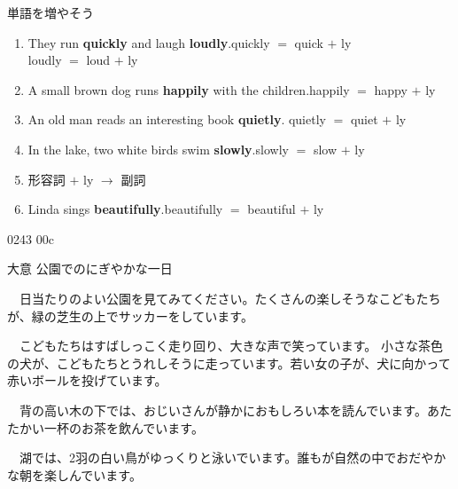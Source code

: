 \documentclass[aspectratio=169, xcolor={dvipsnames,table}]{beamer}
\begin{document}
  \begin{frame}[plain]{単語を増やそう}
    \hypertarget{LY}{}

    \begin{enumerate}[<+->]
      \item They run \textbf{quickly} and laugh \textbf{loudly}.\hfill{}quickly $=$ quick $+$ ly\\
        \hfill{}loudly $=$ loud $+$ ly

      \item A small brown dog runs \textbf{happily} with the children.\hfill{}happily $=$ happy $+$
        ly

      \item An old man reads an interesting book \textbf{quietly}. \hfill{}quietly $=$ quiet $+$ ly

      \item In the lake, two white birds swim \textbf{slowly}.\hfill{}slowly $=$ slow $+$ ly

      \item 形容詞 $+$ ly $\longrightarrow$\,\,副詞

      \item Linda sings \textbf{beautifully}.\hfill{}beautifully $=$ beautiful $+$ ly
    \end{enumerate}

    \hfill{\tiny 0243}\,{\scriptsize{}\,{\tiny 00c}}

    \hfill\hyperlink{reader}{}
  \end{frame}
  \begin{frame}[plain]{大意}
    公園でのにぎやかな一日

    \vspace{10pt}
    　日当たりのよい公園を見てみてください。たくさんの楽しそうなこどもたちが、緑の芝生の上でサッカーをしています。

    　こどもたちはすばしっこく走り回り、大きな声で笑っています。 小さな茶色の犬が、こどもたちとうれしそうに走っています。若い女の子が、犬に向かって赤いボールを投げています。

    　背の高い木の下では、おじいさんが静かにおもしろい本を読んでいます。あたたかい一杯のお茶を飲んでいます。

    　湖では、2羽の白い鳥がゆっくりと泳いでいます。誰もが自然の中でおだやかな朝を楽しんでいます。
  \end{frame}
\end{document}
